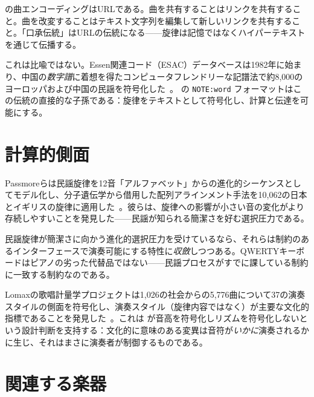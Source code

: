 \documentclass[11pt]{article}
\begin{document}
\np{} の曲エンコーディングはURLである。曲を共有することはリンクを共有すること。曲を改変することはテキスト文字列を編集して新しいリンクを共有すること。「口承伝統」はURLの伝統になる——旋律は記憶ではなくハイパーテキストを通じて伝播する。

これは比喩ではない。Essen関連コード（ESAC）データベースは1982年に始まり、中国の\textit{数字譜}に着想を得たコンピュータフレンドリーな記譜法で約8,000のヨーロッパおよび中国の民謡を符号化した~\citep{schaffrath1995esac}。\np{} の \texttt{NOTE:word} フォーマットはこの伝統の直接的な子孫である：旋律をテキストとして符号化し、計算と伝達を可能にする。

\section{計算的側面}

Passmoreらは民謡旋律を12音「アルファベット」からの進化的シーケンスとしてモデル化し、分子遺伝学から借用した配列アラインメント手法を10,062の日本とイギリスの旋律に適用した~\citep{passmore2023cultural}。彼らは、旋律への影響が小さい音の変化がより存続しやすいことを発見した——民謡が知られる簡潔さを好む選択圧力である。

\begin{card}

民謡旋律が簡潔さに向かう進化的選択圧力を受けているなら、それらは制約のあるインターフェースで演奏可能にする特性に\emph{収斂}しつつある。QWERTYキーボードはピアノの劣った代替品ではない——民謡プロセスがすでに課している制約に一致する制約なのである。
\end{card}

Lomaxの歌唱計量学プロジェクトは1,026の社会からの5,776曲について37の演奏スタイルの側面を符号化し、演奏スタイル（旋律内容ではなく）が主要な文化的指標であることを発見した~\citep{lomax1968folk}。これは \np{} が音高を符号化しリズムを符号化しないという設計判断を支持する：文化的に意味のある変異は音符が\emph{いかに}演奏されるかに生じ、それはまさに演奏者が制御するものである。

\section{関連する楽器}
\end{document}
